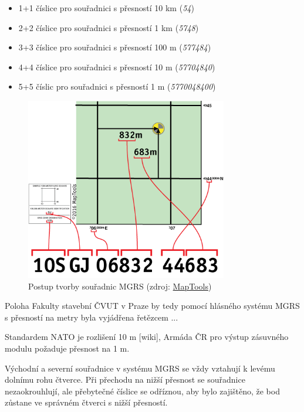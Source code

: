 \begin{itemize}
		\begin{itemize}
				\item 1+1 číslice pro souřadnici s přesností 10 km (\textit{54})
				\item 2+2 číslice pro souřadnici s přesností 1 km (\textit{5748})
				\item 3+3 číslice pro souřadnici s přesností 100 m (\textit{577484})
				\item 4+4 číslice pro souřadnici s přesností 10 m (\textit{57704840})
				\item 5+5 číslic pro souřadnici s přesností 1 m (\textit{5770048400})
		\end{itemize}	
		 
\end{itemize}

\begin{figure}[H]
    \centering
      \includegraphics[width=250pt]{./pictures/MGRS_tvorba.png}
      \caption[Postup tvorby souřadnic MGRS]{Postup tvorby souřadnic MGRS
      (zdroj: \href{https://www.maptools.com/tutorials/mgrs/quick_guide}{MapTools})}
      \label{fig:maptools}
\end{figure}
  
Poloha Fakulty stavební ČVUT v Praze by tedy pomocí hlásného systému MGRS s přesností na metry byla vyjádřena řetězcem ...

Standardem NATO je rozlišení 10 m [wiki], Armáda ČR pro výstup zásuvného modulu požaduje přesnost na 1 m.

Východní a severní souřadnice v systému MGRS se vždy vztahují k levému dolnímu rohu čtverce. Při přechodu na nižší přesnost se souřadnice nezaokrouhlují, ale přebytečné číslice se odříznou, aby bylo zajištěno, že bod zůstane ve správném čtverci s nižší přesností.




